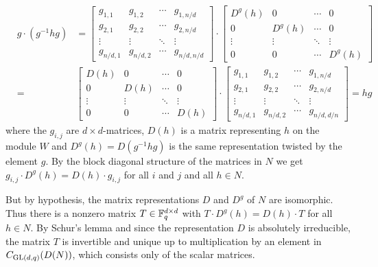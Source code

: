 \begin{eqnarray*}
   &g \cdot (g^{-1}hg) & 
 = \left[ \begin{array}{c|c|c|c}
      g_{1,1} & g_{1,2} & \cdots & g_{1,n/d} \\ \hline
      g_{2,1} & g_{2,2} & \cdots & g_{2,n/d} \\ \hline
      \vdots  & \vdots  & \ddots & \vdots    \\ \hline
      g_{n/d,1}&g_{n/d,2}& \cdots& g_{n/d,n/d} \end{array} \right]
\cdot \left[ \begin{array}{c|c|c|c}
      D^g(h) & 0   & \cdots &      0    \\ \hline
         0   &D^g(h)&\cdots &      0    \\ \hline
      \vdots  & \vdots  & \ddots & \vdots    \\ \hline
         0    &    0    & \cdots& D^g(h) \end{array} \right] \\
 &=& \left[ \begin{array}{c|c|c|c}
      D(h)    & 0       & \cdots &     0    \\ \hline
         0    &D(h)     &\cdots &      0    \\ \hline
      \vdots  & \vdots  & \ddots & \vdots    \\ \hline
         0    &    0    & \cdots& D(h)   \end{array} \right]
\cdot \left[ \begin{array}{c|c|c|c}
      g_{1,1} & g_{1,2} & \cdots & g_{1,n/d} \\ \hline
      g_{2,1} & g_{2,2} & \cdots & g_{2,n/d} \\ \hline
      \vdots  & \vdots  & \ddots & \vdots    \\ \hline
      g_{n/d,1}&g_{n/d,2}& \cdots& g_{n/d,d/n} \end{array} \right]
 = hg
\end{eqnarray*}
where the $g_{i,j}$ are $d \times d$-matrices, $D(h)$ is a matrix
representing $h$ on the module $W$ and $D^g(h) = D(g^{-1}hg)$ is the
same representation twisted by the element $g$. By the block diagonal
structure of the matrices in $N$ we get 
$g_{i,j} \cdot D^g(h) = D(h) \cdot g_{i,j}$ for all $i$ and $j$ and 
all $h \in N$.

But by hypothesis, the matrix representations $D$ and $D^g$ of $N$
are isomorphic. Thus there is a nonzero matrix $T \in \mathbb{F}_q^{d \times d}$ with
$T \cdot D^g(h) = D(h) \cdot T$ for all $h \in N$. By Schur's lemma and
since the representation $D$ is absolutely irreducible,
the matrix $T$ is invertible and unique 
up to multiplication by an element in $C_{\GL(d,q)}(D(N))$, which
consists only of the scalar matrices.

